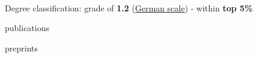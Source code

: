 \documentclass[]{lukas-cv-openfont}
\begin{document}
\noindent
{}
\\
\begin{tightitemize}{1.7em}
    \item Degree classification: grade of \textbf{1.2} (\href{https://en.wikipedia.org/wiki/Academic_grading_in_Germany}{German scale}) - within \textbf{top 5\%}%
\end{tightitemize}

\largesectionsep


\noindent
{}
\vspace{-1.4em}
\begin{btSect}{publications}
    \btPrintNotCited
\end{btSect}
\sectionsep

\noindent
{}
\vspace{-1.4em}
\begin{btSect}{preprints}
    \btPrintNotCited
\end{btSect}
\sectionsep
\end{document}
